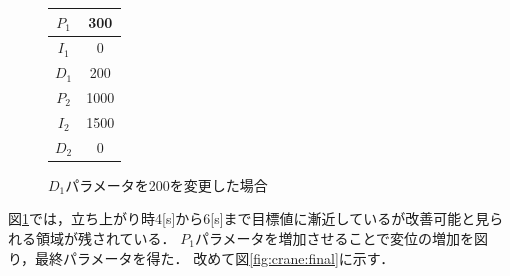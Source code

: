 \documentclass[dvipdfmx,titlepage,a4j]{jsarticle}  %
\begin{document}
\begin{figure}[H]
\begin{minipage}{3cm}
\begin{center}
      \begin{tabular}{c|c}
        \hline
        $P_1$ & 300\\ \hline
        $I_1$ & 0\\ \hline
        $D_1$ & 200\\ \hline
        $P_2$ & 1000\\ \hline
        $I_2$ & 1500\\ \hline
        $D_2$ & 0\\
        \hline
      \end{tabular}
    \end{center}
  \end{minipage}
  \hfill
  \caption{$D_1$パラメータを200を変更した場合}
  \label{fig:crane:11}
\end{figure}

図\ref{fig:crane:11}では，立ち上がり時4[s]から6[s]まで目標値に漸近しているが改善可能と見られる領域が残されている．
$P_1$パラメータを増加させることで変位の増加を図り，最終パラメータを得た．
改めて図\ref{fig:crane:final}に示す．
\end{document}

